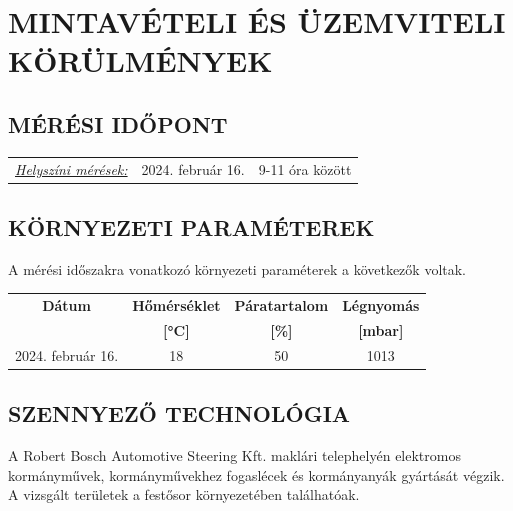 \documentclass[a4paper,12pt]{article}
\renewcommand{\arraystretch}{0.5}
\begin{document}

	\newpage  %
	\section{MINTAVÉTELI ÉS ÜZEMVITELI KÖRÜLMÉNYEK}
	\subsection{MÉRÉSI IDŐPONT}
		\begin{adjustwidth}{1cm}{0cm}
			\begin{tabular}{ p{5.5cm} p{4cm} p{5cm}}
				\textit{\underline{Helyszíni mérések:}} & 2024. február 16. & 9-11 óra között \\
			\end{tabular}
			
		\end{adjustwidth}
	
	
	

	\subsection{KÖRNYEZETI PARAMÉTEREK}
		\begin{adjustwidth}{1cm}{0cm}
			A mérési időszakra vonatkozó környezeti paraméterek a következők voltak. \\
			\begin{table}[h]
				\centering
				\renewcommand{\arraystretch}{1.5}
				\begin{tabular}{|c|c|c|c|}
					\hline
					\textbf{Dátum} & \multicolumn{1}{c|}{\textbf{Hőmérséklet}} & \multicolumn{1}{c|}{\textbf{Páratartalom}} & \multicolumn{1}{c|}{\textbf{Légnyomás}} \\
					& \textbf{[°C]} & \textbf{[\%]} & \textbf{[mbar]} \\
					\hline
					2024. február 16. & 18 & 50 & 1013 \\
					\hline
				\end{tabular}\label{tab:table}
			\end{table}
			
			
		\end{adjustwidth}
	
	\subsection{SZENNYEZŐ TECHNOLÓGIA}
		\begin{adjustwidth}{1cm}{0cm}
			A Robert Bosch Automotive Steering Kft. maklári telephelyén elektromos kormányművek,
kormányművekhez fogaslécek és kormányanyák gyártását végzik. A vizsgált területek a
festősor környezetében találhatóak.
		\end{adjustwidth}
	
\end{document}
